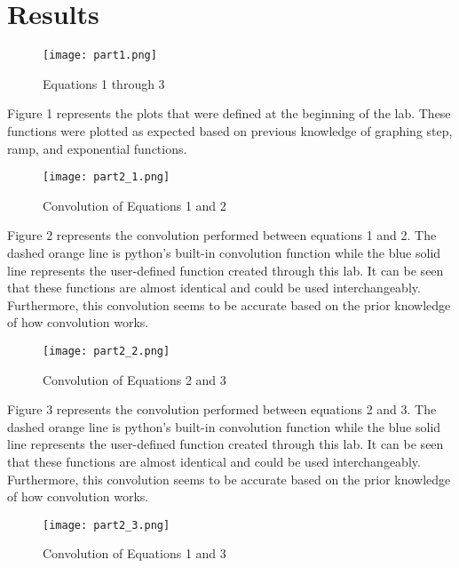 \documentclass[12pt, titlepage]{article}
\begin{document}
        \section{Results}
        \begin{figure}[h!]
            \centering
            \texttt{[image: part1.png]}
            \caption{Equations 1 through 3}
            \label{fig:my_label}
        \end{figure}
        Figure 1 represents the plots that were defined at the beginning of the lab.  These functions were plotted as expected based on previous knowledge of graphing step, ramp, and exponential functions.
        \clearpage
        \begin{figure}[h!]
            \centering
            \texttt{[image: part2\_1.png]}
            \caption{Convolution of Equations 1 and 2}
            \label{fig:my_label}
        \end{figure}
        
        Figure 2 represents the convolution performed between equations 1 and 2.  The dashed orange line is python's built-in convolution function while the blue solid line represents the user-defined function created through this lab.  It can be seen that these functions are almost identical and could be used interchangeably.  Furthermore, this convolution seems to be accurate based on the prior knowledge of how convolution works.
        \clearpage
        \begin{figure}[h!]
            \centering
            \texttt{[image: part2\_2.png]}
            \caption{Convolution of Equations 2 and 3}
            \label{fig:my_label}
        \end{figure}
        
        Figure 3 represents the convolution performed between equations 2 and 3.  The dashed orange line is python's built-in convolution function while the blue solid line represents the user-defined function created through this lab.  It can be seen that these functions are almost identical and could be used interchangeably.  Furthermore, this convolution seems to be accurate based on the prior knowledge of how convolution works.
        \clearpage
        \begin{figure}[h!]
            \centering
            \texttt{[image: part2\_3.png]}
            \caption{Convolution of Equations 1 and 3}
            \label{fig:my_label}
        \end{figure}
        
\end{document}
